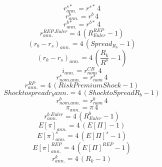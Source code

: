 \begin{dmath}
{r^{s*}_{ann.}}={r^{s*}}\, 4
\end{dmath}
\begin{dmath}
{r^b_{ann.}}={r^b}\, 4
\end{dmath}
\begin{dmath}
{r^{b*}_{ann.}}={r^{b*}}\, 4
\end{dmath}
\begin{dmath}
{ r^{REP.Euler}_{ann.} }=4\, \left({ R^{REP}_{Euler} }-1\right)
\end{dmath}
\begin{dmath}
{ (r_b - r_s)_{ann.} }=4\, \left({Spread_R_b}-1\right)
\end{dmath}
\begin{dmath}
{ (r_k - r_s)_{ann.} }=4\, \left(\frac{{ R_k }}{{R^s}}-1\right)
\end{dmath}
\begin{dmath}
{ i_{ann.}}={ r^{CB}_{nom}}\, 4
\end{dmath}
\begin{dmath}
{ r^s_{nom.ann.}}={ r^s_{nom}}\, 4
\end{dmath}
\begin{dmath}
{ r^{RP}_{ann.}}=4\, \left({ Risk Premium Shock }-1\right)
\end{dmath}
\begin{dmath}
{Shock to spread r_b ann.}=4\, \left({Shock to Spread R_b}-1\right)
\end{dmath}
\begin{dmath}
{ r^b_{nom.ann.}}={ r^b_{nom}}\, 4
\end{dmath}
\begin{dmath}
{ \pi_{ann.} }={ \pi }\, 4
\end{dmath}
\begin{dmath}
{ r^{b.Euler}_{ann.} }=4\, \left({ R^b_{Euler} }-1\right)
\end{dmath}
\begin{dmath}
{ E[\pi]_{ann.} }=4\, \left({ E[\Pi] }-1\right)
\end{dmath}
\begin{dmath}
{ E[\pi]_{ann.}^{s} }=4\, \left({ E[\Pi]^{s} }-1\right)
\end{dmath}
\begin{dmath}
{ E[\pi]_{ann.}^{REP} }=4\, \left({ E[\Pi]^{REP} }-1\right)
\end{dmath}
\begin{dmath}
{ r^k_{ann.} }=4\, \left({ R_k }-1\right)
\end{dmath}
